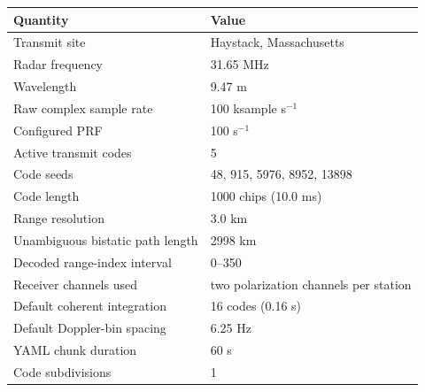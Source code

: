 \begin{tabular}{ll}
\toprule
Quantity & Value \\
\midrule
Transmit site & Haystack, Massachusetts \\
Radar frequency & 31.65 MHz \\
Wavelength & 9.47 m \\
Raw complex sample rate & 100 ksample s$^{-1}$ \\
Configured PRF & 100 s$^{-1}$ \\
Active transmit codes & 5 \\
Code seeds & 48, 915, 5976, 8952, 13898 \\
Code length & 1000 chips (10.0 ms) \\
Range resolution & 3.0 km \\
Unambiguous bistatic path length & 2998 km \\
Decoded range-index interval & 0--350 \\
Receiver channels used & two polarization channels per station \\
Default coherent integration & 16 codes (0.16 s) \\
Default Doppler-bin spacing & 6.25 Hz \\
YAML chunk duration & 60 s \\
Code subdivisions & 1 \\
\bottomrule
\end{tabular}
